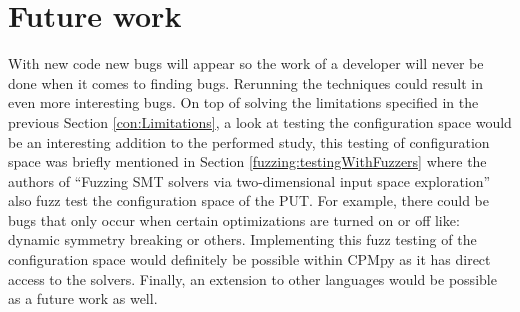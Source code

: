 


\section{Future work}
\label{con:FutureWork}
With new code new bugs will appear so the work of a developer will never be done when it comes to finding bugs. Rerunning the techniques could result in even more interesting bugs. 
On top of solving the limitations specified in the previous Section \ref{con:Limitations},
a look at testing the configuration space would be an interesting addition to the performed study, this testing of configuration space was briefly mentioned in Section \ref{fuzzing:testingWithFuzzers} where the authors of “Fuzzing SMT solvers via two-dimensional input space exploration” \cite{42FalconFuzzingConfigurationSettingsAndNormal} also fuzz test the configuration space of the PUT. For example, there could be bugs that only occur when certain optimizations are turned on or off like: dynamic symmetry breaking or others. Implementing this fuzz testing of the configuration space would definitely be possible within CPMpy as it has direct access to the solvers.
Finally, an extension to other languages would be possible as a future work as well.


